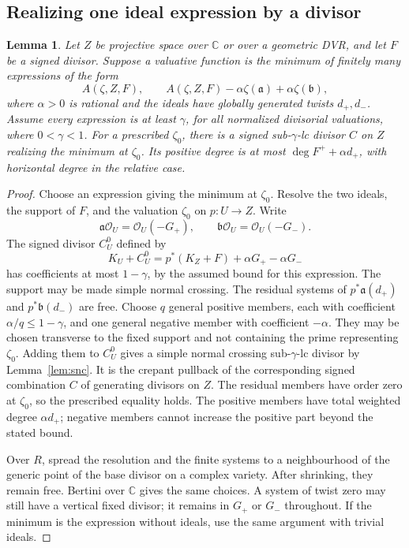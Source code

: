 \documentclass[11pt,reqno]{amsart}
\numberwithin{equation}{section}
\newtheorem{lemma}[theorem]{Lemma}
\theoremstyle{definition}
\theoremstyle{remark}
\newcommand{\C}{\mathbb C}
\newcommand{\OO}{\mathcal O}
\newcommand{\ba}{\mathfrak a}
\newcommand{\bb}{\mathfrak b}
\begin{document}
\subsection{Realizing one ideal expression by a divisor}
\begin{lemma}\label{lem:realize}
Let $Z$ be projective space over $\C$ or over a geometric DVR, and let $F$ be a signed divisor. Suppose a valuative function is the minimum of finitely many expressions of the form
\[
 A(\zeta,Z,F),\qquad
 A(\zeta,Z,F)-\alpha\zeta(\ba)+\alpha\zeta(\bb),
\]
where $\alpha>0$ is rational and the ideals have globally generated twists $d_+,d_-$. Assume every expression is at least $\gamma$, for all normalized divisorial valuations, where $0<\gamma<1$. For a prescribed $\zeta_0$, there is a signed sub-$\gamma$-lc divisor $C$ on $Z$ realizing the minimum at $\zeta_0$. Its positive degree is at most $\deg F^++\alpha d_+$, with horizontal degree in the relative case.
\end{lemma}
\begin{proof}
Choose an expression giving the minimum at $\zeta_0$. Resolve the two ideals, the support of $F$, and the valuation $\zeta_0$ on $p:U\to Z$. Write
\[
 \ba\OO_U=\OO_U(-G_+),\qquad
 \bb\OO_U=\OO_U(-G_-).
\]
The signed divisor $C_U^0$ defined by
\[
 K_U+C_U^0=p^*(K_Z+F)+\alpha G_+-\alpha G_-
\]
has coefficients at most $1-\gamma$, by the assumed bound for this expression. The support may be made simple normal crossing. The residual systems of $p^*\ba(d_+)$ and $p^*\bb(d_-)$ are free. Choose $q$ general positive members, each with coefficient $\alpha/q\le1-\gamma$, and one general negative member with coefficient $-\alpha$. They may be chosen transverse to the fixed support and not containing the prime representing $\zeta_0$. Adding them to $C_U^0$ gives a simple normal crossing sub-$\gamma$-lc divisor by Lemma~\ref{lem:snc}. It is the crepant pullback of the corresponding signed combination $C$ of generating divisors on $Z$. The residual members have order zero at $\zeta_0$, so the prescribed equality holds. The positive members have total weighted degree $\alpha d_+$; negative members cannot increase the positive part beyond the stated bound.

Over $R$, spread the resolution and the finite systems to a neighbourhood of the generic point of the base divisor on a complex variety. After shrinking, they remain free. Bertini over $\C$ gives the same choices. A system of twist zero may still have a vertical fixed divisor; it remains in $G_+$ or $G_-$ throughout. If the minimum is the expression without ideals, use the same argument with trivial ideals.
\end{proof}
\end{document}
